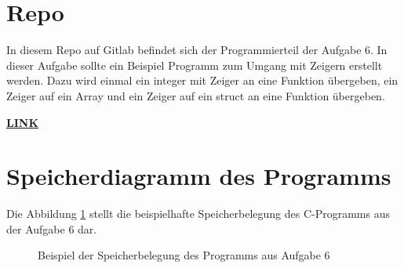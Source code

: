 \section{Repo}
In diesem Repo auf Gitlab befindet sich der Programmierteil der Aufgabe 6. In dieser Aufgabe sollte ein Beispiel Programm zum Umgang mit Zeigern erstellt werden. Dazu wird einmal ein integer mit Zeiger an eine Funktion übergeben, ein Zeiger auf ein Array und ein Zeiger auf ein struct an eine Funktion übergeben.\par
\href{https://gitlab.thga.de/daniel.krueger/pruefung_sose_2023_aufgabe_6_pointer}{\textbf{LINK}}

\section{Speicherdiagramm des Programms}
Die Abbildung \ref{speicherdiagramm} stellt die beispielhafte Speicherbelegung des C-Programms aus der Aufgabe 6 dar.\par

\begin{figure}[h]
	\centering
	\caption{Beispiel der Speicherbelegung des Programms aus Aufgabe 6}
	\label{speicherdiagramm}
\end{figure}
